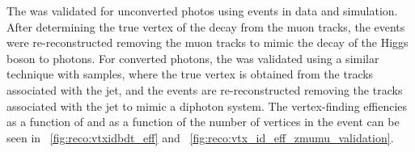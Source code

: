 The \VtxIdBdt was validated for unconverted photos using \Zmumu events in data and simulation. After determining the true vertex of the decay from the muon tracks, the events were re-reconstructed removing the muon tracks to mimic the decay of the Higgs boson to photons.  For converted photons, the \VtxIdBdt was validated using a similar technique with \gammaJet samples, where the true vertex is obtained from the tracks associated with the jet, and the events are re-reconstructed removing the tracks associated with the jet to mimic a diphoton system. The vertex-finding effiencies as a function of \pT and as a function of the number of vertices in the event can be seen in \Fig~\ref{fig:reco:vtxidbdt_eff} and \Fig~\ref{fig:reco:vtx_id_eff_zmumu_validation}. %
